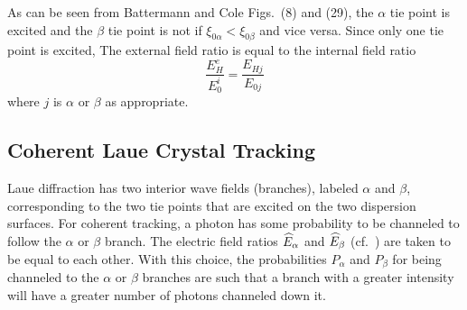 As can be seen from Battermann and Cole Figs.~(8) and (29), the $\alpha$ tie point is excited and
the $\beta$ tie point is not if $\xi_{0\alpha} < \xi_{0\beta}$ and vice versa. Since only one tie
point is excited, The external field ratio is equal to the internal field ratio
\begin{equation}
  \frac{E_H^e}{E_0^i} = \frac{E_{Hj}}{E_{0j}}
\end{equation}
where $j$ is $\alpha$ or $\beta$ as appropriate.

\subsection{Coherent Laue Crystal Tracking}
\label{s:coherent.laue}

Laue diffraction has two interior wave fields (branches), labeled $\alpha$ and $\beta$,
corresponding to the two tie points that are excited on the two dispersion surfaces. For coherent
tracking, a photon has some probability to be channeled to follow the $\alpha$ or $\beta$
branch. The electric field ratios $\widehat E_\alpha$ and $\widehat E_\beta$ (cf.~) are taken to
be equal to each other. With this choice, the probabilities $P_\alpha$ and $P_\beta$ for being
channeled to the $\alpha$ or $\beta$ branches are such that a branch with a greater intensity will
have a greater number of photons channeled down it.

